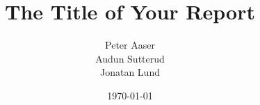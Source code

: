 \newcommand{\mytitle}{The Title of Your Report}
\newcommand{\myauthor}{Peter Aaser\\Audun Sutterud\\Jonatan Lund}

\title{\mytitle}
\author{\myauthor}
\date{\today}
